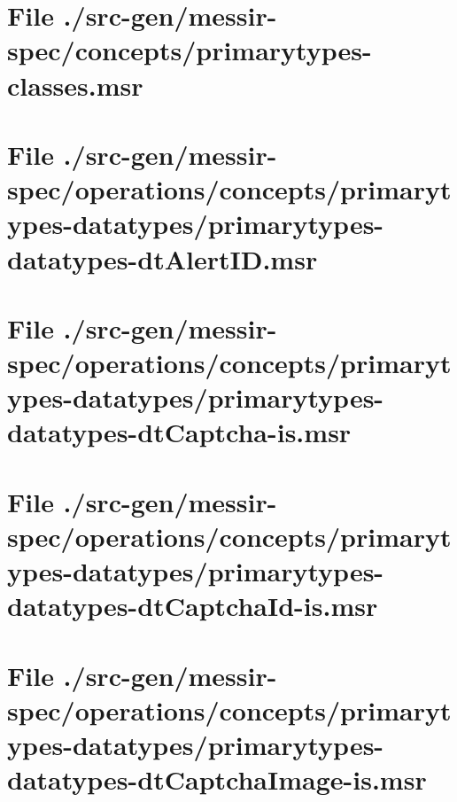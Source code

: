 \section[File /src-gen/messir-spec/concepts/primarytypes-classes.msr]{File ./src-gen/messir-spec/concepts/primarytypes-classes.msr}
\scriptsize

\normalsize
	
\section[File /src-gen/messir-spec/operations.../primarytypes-datatypes-dtAlertID.msr]{File ./src-gen/messir-spec/operations/concepts/primarytypes-datatypes/primarytypes-datatypes-dtAlertID.msr}
\scriptsize

\normalsize
	
\section[File /src-gen/messir-spec/operations.../primarytypes-datatypes-dtCaptcha-is.msr]{File ./src-gen/messir-spec/operations/concepts/primarytypes-datatypes/primarytypes-datatypes-dtCaptcha-is.msr}
\scriptsize

\normalsize
	
\section[File /src-gen/messir-spec.../primarytypes-datatypes-dtCaptchaId-is.msr]{File ./src-gen/messir-spec/operations/concepts/primarytypes-datatypes/primarytypes-datatypes-dtCaptchaId-is.msr}
\scriptsize

\normalsize
	
\section[File /src-gen/messir-spec.../primarytypes-datatypes-dtCaptchaImage-is.msr]{File ./src-gen/messir-spec/operations/concepts/primarytypes-datatypes/primarytypes-datatypes-dtCaptchaImage-is.msr}
\scriptsize

\normalsize
	
